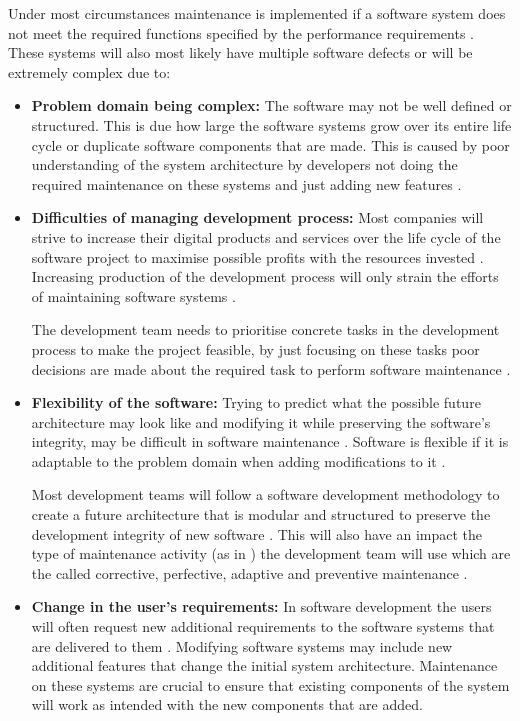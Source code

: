 Under most circumstances maintenance is implemented if a software system does not meet the required functions specified by the performance requirements \cite{Ogheneovo2014, Sneed2004}. These systems will also most likely have multiple software defects or will be extremely complex due to:

\begin{itemize}
	\item \textbf{Problem domain being complex:} The software may not be well defined or structured. This is due how large the software systems grow over its entire life cycle or duplicate software components that are made. This is caused by poor understanding of the system architecture by developers not doing the required maintenance on these systems and just adding new features \cite{Galster2019, Booch1986}.
	\item \textbf{Difficulties of managing development process:} Most companies will strive to increase their digital products and services over the life cycle of the software project to maximise possible profits with the resources invested \cite{Niu2018}. Increasing production of the development process will only strain the efforts of maintaining software systems \cite{Sneed2004}.\par The development team needs to prioritise concrete tasks in the development process to make the project feasible, by just focusing on these tasks poor decisions are made about the required task to perform software maintenance \cite{Galster2019, Ogheneovo2014, Lenarduzzi2017}. 
	\item \textbf{Flexibility of the software:} Trying to predict what the possible future architecture may look like and modifying it while preserving the software's integrity, may be difficult in software maintenance \cite{Garlan1999}. Software is flexible if it is adaptable to the problem domain when adding modifications to it \cite{Ogheneovo2014}.\par Most development teams will follow a software development methodology to create a future architecture that is modular and structured to preserve the development integrity of new software \cite{Vijayasarathy2016, Rehman2018}. This will also have an impact the type of maintenance activity (as in ) the development team will use which are the called corrective, perfective, adaptive and preventive maintenance \cite{FrancisThamburaj2017, Hasan2012, Stojanov2017, Snipes2018}.
	\item \textbf{Change in the user's requirements:} In software development the users will often request new additional requirements to the software systems that are delivered to them \cite{Ogheneovo2014}. Modifying software systems may include new additional features that change the initial system architecture. Maintenance on these systems are crucial to ensure that existing components of the system will work as intended with the new components that are added.
\end{itemize}

